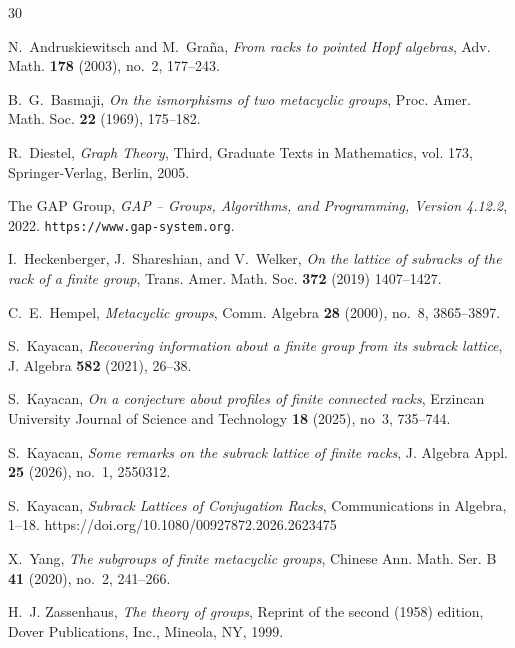 \documentclass[a4paper,12pt]{article}
\theoremstyle{definition}
\theoremstyle{remark}
\begin{document}
% 
% 


\begin{thebibliography}{30}

N.~Andruskiewitsch and M.~Gra{\~n}a, \emph{From racks to pointed {H}opf algebras}, Adv. Math. \textbf{178} (2003), no.~2, 177--243.

B.~G.~Basmaji, \emph{On the ismorphisms of two metacyclic groups}, Proc. Amer. Math. Soc. \textbf{22} (1969), 175--182.
  
R.~Diestel, \emph{Graph Theory}, Third, Graduate Texts in Mathematics, vol. 173, Springer-Verlag, Berlin, 2005.

The GAP Group, \emph{{GAP -- Groups, Algorithms, and Programming, Version 4.12.2}}, 2022. \texttt{https://www.gap-system.org}.

I.~{Heckenberger}, J.~{Shareshian}, and V.~{Welker}, \emph{{On the lattice of subracks of the rack of a finite group}}, Trans. Amer. Math. Soc. \textbf{372} (2019) 1407--1427.

C.~E.~Hempel, \emph{Metacyclic groups}, Comm. Algebra \textbf{28} (2000), no.~8, 3865--3897.

S.~Kayacan, \emph{Recovering information about a finite group from its subrack lattice}, J. Algebra \textbf{582} (2021), 26--38.
  
S.~Kayacan, \emph{On a conjecture about profiles of finite connected racks}, Erzincan University Journal of Science and Technology \textbf{18} (2025), no~3, 735--744.

S.~Kayacan, \emph{Some remarks on the subrack lattice of finite racks}, J. Algebra Appl. \textbf{25} (2026), no.~1, 2550312.

S.~Kayacan, \emph{Subrack Lattices of Conjugation Racks}, Communications in Algebra, 1--18. https://doi.org/10.1080/00927872.2026.2623475


X.~Yang, \emph{The subgroups of finite metacyclic groups}, Chinese Ann. Math. Ser. B \textbf{41} (2020), no.~2, 241--266.

H.~J. Zassenhaus, \emph{The theory of groups}, Reprint of the second (1958) edition, Dover Publications, Inc., Mineola, NY, 1999.





\end{thebibliography}
\end{document}
